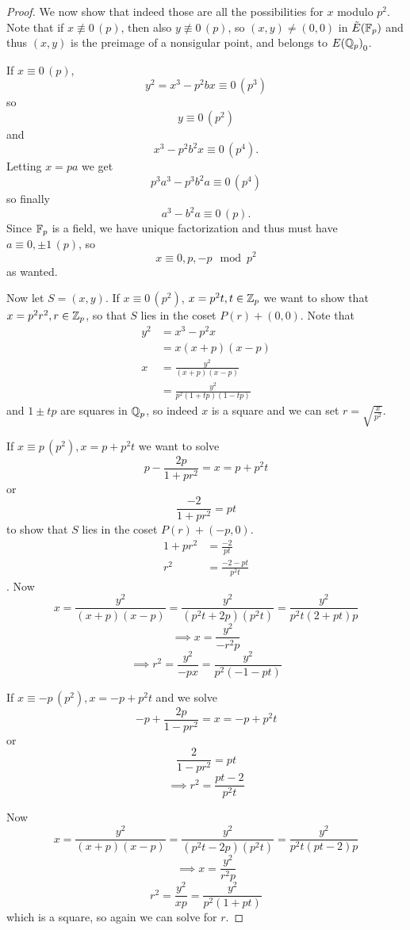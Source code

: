 \documentclass[12pt, a4paper]{amsart}
\begin{document}
\begin{proof}
  We now show that indeed those are all the possibilities for $x$ modulo $p^2$.
  Note that if $x \not\equiv 0 \, (p)$, then also $y \not\equiv 0 \, (p)$, so
  $(x,y) \neq (0,0)$ in ${\tilde{E}(\mathbb{F}_p)}$ and thus $(x,y)$ is the preimage of a nonsigular
  point, and belongs to ${E({\mathbb Q}_p)}_0$.

  If $x \equiv 0 \, (p)$,
  \[y^2 = x^3 - p^2bx\equiv 0 \,(p^3)\]
  so
  \[y \equiv 0 \, (p^2)\]
  and
  \[ x^3-p^2b^2x \equiv 0 \, (p^4).\]
  Letting $x = pa$ we get
  \[p^3a^3-p^3b^2a \equiv 0 \, (p^4)\]
  so finally
  \[a^3 - b^2a \equiv 0 \, (p).\]
  Since $\mathbb{F}_p$ is a field, we have unique factorization and thus must have
  $a \equiv 0, \pm 1 \, (p)$, so
  \[x \equiv 0, p, -p \mod{p^2}\]
  as wanted.

  
  

  

Now let $S = (x,y)$.
If $x \equiv 0 \, (p^2)$, $x = p^2 t, t \in {\mathbb Z}_p$ we want to show that $x = p^2r^2, r \in {\mathbb Z}_p$, so that $S$ lies
in the coset $P(r) + (0,0)$. Note that
\begin{equation*}
  \begin{split}
    y^2 &= x^3 - p^2x \\
    &= x(x+p)(x-p) \\
    x &= \frac{y^2}{(x+p)(x-p)} \\
    &= \frac{y^2}{p^2(1+tp)(1-tp)}
  \end{split}
\end{equation*}
and $1 \pm tp$ are squares in ${\mathbb Q}_p$, so indeed $x$ is a square and we can set
$r = \sqrt{\frac{x}{p^2}}$.

If $x \equiv p \, (p^2), x = p + p^2t$ we want to solve
\[p - \frac{2p}{1+pr^2} = x = p + p^2t \] or
\[ \frac{-2}{1+pr^2} = pt\]
to show that $S$ lies in the coset $P(r)+(-p,0)$.
\begin{equation*}
  \begin{split}
    1+pr^2 &= \frac{-2}{pt} \\
    r^2 &= \frac{-2-pt}{p^2t}
  \end{split}
\end{equation*}.
Now
\[ x = \frac{y^2}{(x+p)(x-p)} = \frac{y^2}{(p^2t+2p)(p^2t)}
= \frac{y^2}{p^2t(2+pt)p}\]
\[ \implies x = \frac{y^2}{-r^2 p}\]
\[ \implies r^2 = \frac{y^2}{-px} = \frac{y^2}{p^2(-1-pt)}\]


If $x \equiv -p \, (p^2), x = -p + p^2t$ and we solve
\[ -p + \frac{2p}{1-pr^2} = x = -p + p^2t\] or
\[ \frac{2}{1-pr^2} = pt\]
\[ \implies r^2 = \frac{pt - 2}{p^2t}\]

Now
\[ x = \frac{y^2}{(x+p)(x-p)} = \frac{y^2}{(p^2t-2p)(p^2t)}
= \frac{y^2}{p^2t(pt-2)p}\]
\[\implies x = \frac{y^2}{r^2p}\]
\[ r^2 = \frac{y^2}{xp} = \frac{y^2}{p^2(1+pt)}\]
which is a square, so again we can solve for $r$.

\end{proof}
\end{document}
